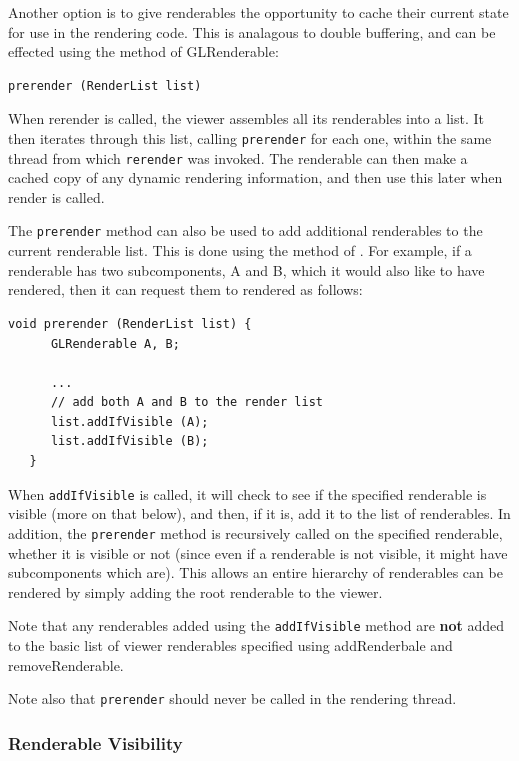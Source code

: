 \documentclass{article}
\begin{document}
Another option is to give renderables the opportunity to cache their
current state for use in the rendering code. This is analagous to
double buffering, and can be effected using the 
 method of
GLRenderable:

\begin{lstlisting}[]
   prerender (RenderList list)
\end{lstlisting}

When rerender is called, the viewer assembles all its renderables into
a list. It then iterates through this list, calling {\tt prerender}
for each one, within the same thread from which {\tt rerender} was
invoked. The renderable can then make a cached copy of any dynamic
rendering information, and then use this later when render is called.

The {\tt prerender} method can also be used to add additional renderables to
the current renderable list. This is done using the 
method of . For example, if a renderable has two
subcomponents, A and B, which it would also like to have rendered,
then it can request them to rendered as follows:
\begin{lstlisting}[]
   void prerender (RenderList list) {
      GLRenderable A, B;

      ... 
      // add both A and B to the render list
      list.addIfVisible (A);
      list.addIfVisible (B);
   }
\end{lstlisting}
When {\tt addIfVisible} is called, it will check to see if the specified
renderable is visible (more on that below), and then, if it is, add it
to the list of renderables. In addition, the {\tt prerender} method is
recursively called on the specified renderable, whether it is visible or
not (since even if a renderable is not visible, it might have
subcomponents which are).  This allows an entire hierarchy of
renderables can be rendered by simply adding the root renderable to
the viewer.

Note that any renderables added using the {\tt addIfVisible} method are
{\bf not} added to the basic list of viewer renderables specified using
addRenderbale and removeRenderable.

Note also that {\tt prerender} should never be called in the rendering
thread.

\subsubsection{Renderable Visibility}
\label{visibilitySec}
\end{document}
